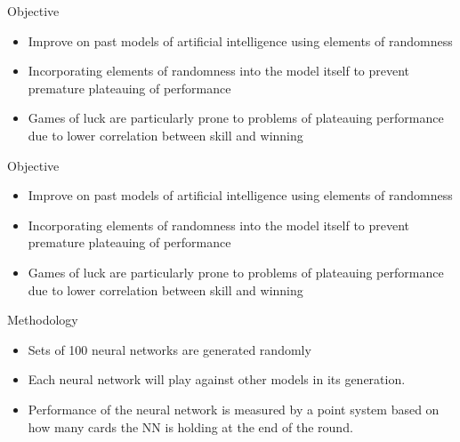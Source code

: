 \documentclass{beamer}
\begin{document}
\begin{frame}{Objective}
	
	\begin{itemize}
		
		\item Improve on past models of artificial intelligence using elements of randomness
		\item Incorporating elements of randomness into the model itself to prevent premature plateauing of performance
		\item Games of luck are particularly prone to problems of plateauing performance due to lower correlation between skill and winning

	\end{itemize}
	
\end{frame}

\begin{frame}{Objective}
	
	\begin{itemize}
		
		\item Improve on past models of artificial intelligence using elements of randomness
		\item Incorporating elements of randomness into the model itself to prevent premature plateauing of performance
		\item Games of luck are particularly prone to problems of plateauing performance due to lower correlation between skill and winning
		
	\end{itemize}
	
\end{frame}

\begin{frame}{Methodology}
	
	\begin{itemize}
	
		\item Sets of 100 neural networks are generated randomly
		\item Each neural network will play against other models in its generation.
		\item Performance of the neural network is measured by a point system based on how many cards the NN is holding at the end of the round.

	\end{itemize}
	
\end{frame}
\end{document}
